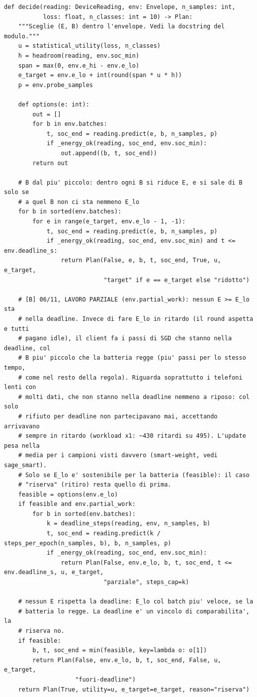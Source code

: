 \documentclass[11pt,a4paper]{article}
\begin{document}
\begin{lstlisting}[style=py,firstnumber=173,caption={\texttt{tesifl/tesiFL/client\_policy.py}, lines 173--226}]
def decide(reading: DeviceReading, env: Envelope, n_samples: int,
           loss: float, n_classes: int = 10) -> Plan:
    """Sceglie (E, B) dentro l'envelope. Vedi la docstring del modulo."""
    u = statistical_utility(loss, n_classes)
    h = headroom(reading, env.soc_min)
    span = max(0, env.e_hi - env.e_lo)
    e_target = env.e_lo + int(round(span * u * h))
    p = env.probe_samples

    def options(e: int):
        out = []
        for b in env.batches:
            t, soc_end = reading.predict(e, b, n_samples, p)
            if _energy_ok(reading, soc_end, env.soc_min):
                out.append((b, t, soc_end))
        return out

    # B dal piu' piccolo: dentro ogni B si riduce E, e si sale di B solo se
    # a quel B non ci sta nemmeno E_lo
    for b in sorted(env.batches):
        for e in range(e_target, env.e_lo - 1, -1):
            t, soc_end = reading.predict(e, b, n_samples, p)
            if _energy_ok(reading, soc_end, env.soc_min) and t <= env.deadline_s:
                return Plan(False, e, b, t, soc_end, True, u, e_target,
                            "target" if e == e_target else "ridotto")

    # [B] 06/11, LAVORO PARZIALE (env.partial_work): nessun E >= E_lo sta
    # nella deadline. Invece di fare E_lo in ritardo (il round aspetta e tutti
    # pagano idle), il client fa i passi di SGD che stanno nella deadline, col
    # B piu' piccolo che la batteria regge (piu' passi per lo stesso tempo,
    # come nel resto della regola). Riguarda soprattutto i telefoni lenti con
    # molti dati, che non stanno nella deadline nemmeno a riposo: col solo
    # rifiuto per deadline non partecipavano mai, accettando arrivavano
    # sempre in ritardo (workload x1: ~430 ritardi su 495). L'update pesa nella
    # media per i campioni visti davvero (smart-weight, vedi sage_smart).
    # Solo se E_lo e' sostenibile per la batteria (feasible): il caso
    # "riserva" (ritiro) resta quello di prima.
    feasible = options(env.e_lo)
    if feasible and env.partial_work:
        for b in sorted(env.batches):
            k = deadline_steps(reading, env, n_samples, b)
            t, soc_end = reading.predict(k / steps_per_epoch(n_samples, b), b, n_samples, p)
            if _energy_ok(reading, soc_end, env.soc_min):
                return Plan(False, env.e_lo, b, t, soc_end, t <= env.deadline_s, u, e_target,
                            "parziale", steps_cap=k)

    # nessun E rispetta la deadline: E_lo col batch piu' veloce, se la
    # batteria lo regge. La deadline e' un vincolo di comparabilita', la
    # riserva no.
    if feasible:
        b, t, soc_end = min(feasible, key=lambda o: o[1])
        return Plan(False, env.e_lo, b, t, soc_end, False, u, e_target,
                    "fuori-deadline")
    return Plan(True, utility=u, e_target=e_target, reason="riserva")
\end{lstlisting}
\end{document}
